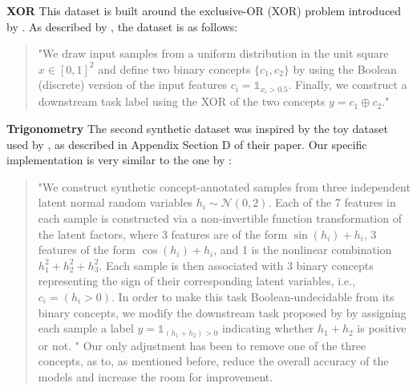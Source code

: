 \documentclass[sigconf, nonacm]{acmart}
\begin{document}
\textbf{XOR} This dataset is built around the exclusive-OR (XOR) problem introduced by \citet{minsky1969perceptrons}. As described by \citet{barbiero2023interpretable}, the dataset is as follows:
\begin{quote}
"We draw input samples from a uniform distribution in the unit square \( x \in [0, 1]^2 \) and define two binary concepts \(\{c_1, c_2\}\) by using the Boolean (discrete) version of the input features \( c_i = \mathbb{1}_{x_i > 0.5} \). Finally, we construct a downstream task label using the XOR of the two concepts \( y = c_1 \oplus c_2 \)."
\end{quote} \vspace{8pt}

\textbf{Trigonometry} The second synthetic dataset was inspired by the toy dataset used by \citet{mahinpei2021promisespitfallsblackboxconcept}, as described in Appendix Section D of their paper. Our specific implementation is very similar to the one by \citet{barbiero2023interpretable}:
\begin{quote}
"We construct synthetic concept-annotated samples from three independent latent normal random variables \( h_i \sim \mathcal{N}(0, 2) \). Each of the 7 features in each sample is constructed via a non-invertible function transformation of the latent factors, where 3 features are of the form \( \sin(h_i) + h_i \), 3 features of the form \( \cos(h_i) + h_i \), and 1 is the nonlinear combination \( h_1^2 + h_2^2 + h_3^2 \). Each sample is then associated with 3 binary concepts representing the sign of their corresponding latent variables, i.e., \( c_i = (h_i > 0) \). In order to make this task Boolean-undecidable from its binary concepts, we modify the downstream task proposed by \citet{mahinpei2021promisespitfallsblackboxconcept} by assigning each sample a label \( y = \mathbb{1}_{(h_1 + h_2) > 0} \) indicating whether \( h_1 + h_2 \) is positive or not.
"
Our only adjustment has been to remove one of the three concepts, as to, as mentioned before, reduce the overall accuracy of the models and increase the room for improvement.
\end{quote} \vspace{8pt}
\end{document}
